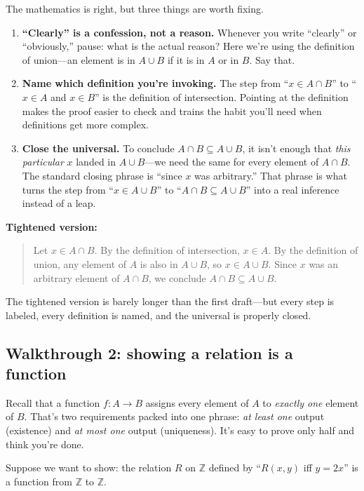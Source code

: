 \documentclass[11pt]{article}
\begin{document}
The mathematics is right, but three things are worth fixing.

\begin{enumerate}
  \item \textbf{``Clearly'' is a confession, not a reason.} Whenever you write ``clearly'' or ``obviously,'' pause: what is the actual reason? Here we're using the definition of union---an element is in $A \cup B$ if it is in $A$ or in $B$. Say that.
  \item \textbf{Name which definition you're invoking.} The step from ``$x \in A \cap B$'' to ``$x \in A$ and $x \in B$'' is the definition of intersection. Pointing at the definition makes the proof easier to check and trains the habit you'll need when definitions get more complex.
  \item \textbf{Close the universal.} To conclude $A \cap B \subseteq A \cup B$, it isn't enough that \emph{this particular} $x$ landed in $A \cup B$---we need the same for every element of $A \cap B$. The standard closing phrase is ``since $x$ was arbitrary.'' That phrase is what turns the step from ``$x \in A \cup B$'' to ``$A \cap B \subseteq A \cup B$'' into a real inference instead of a leap.
\end{enumerate}

\medskip
\noindent\textbf{Tightened version:}
\begin{quote}
Let $x \in A \cap B$. By the definition of intersection, $x \in A$. By the definition of union, any element of $A$ is also in $A \cup B$, so $x \in A \cup B$. Since $x$ was an arbitrary element of $A \cap B$, we conclude $A \cap B \subseteq A \cup B$.
\end{quote}

The tightened version is barely longer than the first draft---but every step is labeled, every definition is named, and the universal is properly closed.

\subsection*{Walkthrough 2: showing a relation is a function}

Recall that a function $f : A \to B$ assigns every element of $A$ to \emph{exactly one} element of $B$. That's two requirements packed into one phrase: \emph{at least one} output (existence) and \emph{at most one} output (uniqueness). It's easy to prove only half and think you're done.

Suppose we want to show: the relation $R$ on $\mathbb{Z}$ defined by ``$R(x, y)$ iff $y = 2x$'' is a function from $\mathbb{Z}$ to $\mathbb{Z}$.
\end{document}
